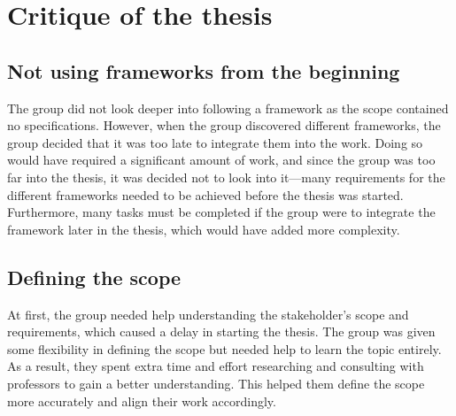 \section{Critique of the thesis}

\subsection{Not using frameworks from the beginning}
The group did not look deeper into following a framework as the scope contained no specifications. However, when the group discovered different frameworks, the group decided that it was too late to integrate them into the work. Doing so would have required a significant amount of work, and since the group was too far into the thesis, it was decided not to look into it—many requirements for the different frameworks needed to be achieved before the thesis was started. Furthermore, many tasks must be completed if the group were to integrate the framework later in the thesis, which would have added more complexity. 

\subsection{Defining the scope}
At first, the group needed help understanding the stakeholder's scope and requirements, which caused a delay in starting the thesis. The group was given some flexibility in defining the scope but needed help to learn the topic entirely. As a result, they spent extra time and effort researching and consulting with professors to gain a better understanding. This helped them define the scope more accurately and align their work accordingly.


